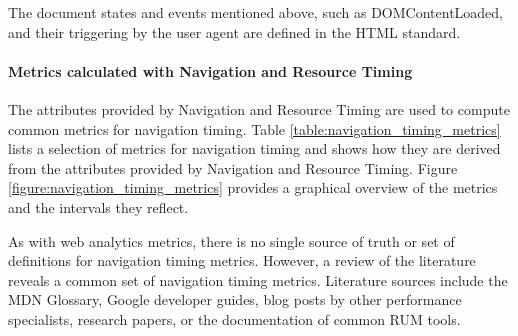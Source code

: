 The document states and events mentioned above, such as DOMContentLoaded, and their triggering by the user agent are defined in the HTML standard.











\paragraph{Metrics calculated with Navigation and Resource Timing} %

The attributes provided by Navigation and Resource Timing are used to compute common metrics for navigation timing.
Table \ref{table:navigation_timing_metrics} lists a selection of metrics for navigation timing and shows how they are derived from the attributes provided by Navigation and Resource Timing.
Figure \ref{figure:navigation_timing_metrics} provides a graphical overview of the metrics and the intervals they reflect.

As with web analytics metrics, there is no single source of truth or set of definitions for navigation timing metrics.
However, a review of the literature reveals a common set of navigation timing metrics.
Literature sources include the MDN Glossary, %
Google developer guides, %
blog posts by other performance specialists, %
research papers, %
or the documentation of common RUM tools. %

